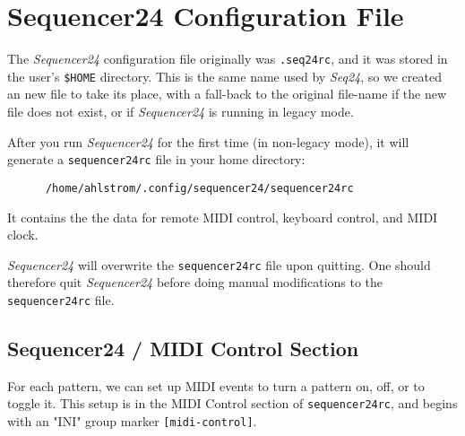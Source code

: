 %
%
%

\section{Sequencer24 Configuration File}
\label{sec:seq24_rc_file}

   \index{[sequencer24rc]}   %
   The \textsl{Sequencer24} configuration file originally was \texttt{.seq24rc},
   and it was stored in the user's \texttt{\$HOME} directory.
   This is the same name used by \textsl{Seq24}, so we created an new file
   to take its place, with a fall-back to the original file-name if the new
   file does not exist, or if \textsl{Sequencer24} is running in
   legacy mode.

   After you run \textsl{Sequencer24} for the first time (in non-legacy
   mode), it will generate a \texttt{sequencer24rc} file in your home
   directory:

   \begin{verbatim}
      /home/ahlstrom/.config/sequencer24/sequencer24rc
   \end{verbatim}

   It contains the the data for remote MIDI control, keyboard
   control, and MIDI clock.

   \textsl{Sequencer24} will overwrite the \texttt{sequencer24rc} file upon
   quitting.  One should therefore quit \textsl{Sequencer24} before doing
   manual modifications to the
   \texttt{sequencer24rc} file.

\subsection{Sequencer24 / MIDI Control Section}
\label{subsec:seq24_rc_file_midi_control}

   For each pattern, we can set up MIDI events to turn a 
	pattern on, off, or to toggle it.  This setup is in the 
   MIDI Control section of \texttt{sequencer24rc}, and begins with an
   "INI" group marker \texttt{[midi-control]}.
	
